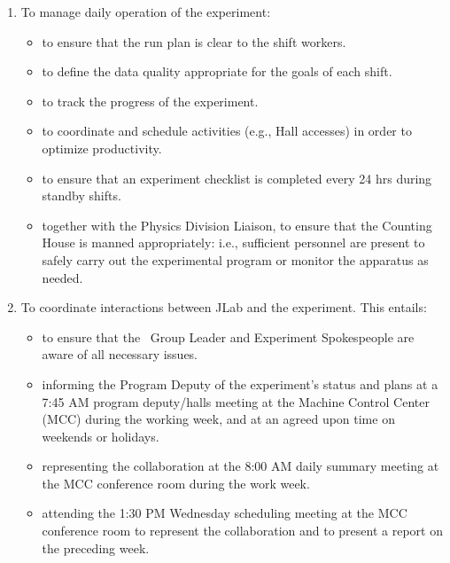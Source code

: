 \documentclass[11pt]{article}
\begin{document}
\begin{enumerate}[label=\Roman*.]
\item To manage daily operation of the experiment:

\begin{itemize}

\item to ensure that the run plan is clear to the shift workers.

\item to define the data quality appropriate for the goals of each shift.

\item to track the progress of the experiment.

\item to coordinate and schedule activities (e.g.,
Hall accesses) in order to optimize productivity.

\item to ensure that an experiment checklist is completed every 24 hrs during 
standby shifts.

\item together with the Physics Division Liaison, 
to ensure that the Counting House is manned appropriately: i.e.,
sufficient personnel are present to safely carry out the experimental 
program or monitor the apparatus as needed.

\end{itemize}



\item To coordinate interactions between JLab and the experiment. This
 entails:

\begin{itemize}

\item to ensure that the \HALL\ Group Leader and Experiment
Spokespeople are  aware of all necessary issues.

\item informing the Program Deputy of the experiment's status and plans at 
a 7:45 AM program deputy/halls meeting at the Machine Control Center (MCC) during the working week, and at an agreed
upon time on weekends or holidays.

\item representing the collaboration at the 8:00 AM daily summary meeting at the MCC conference 
room during the work week. 

\item attending the 1:30 PM Wednesday scheduling meeting at the MCC conference 
room to represent the collaboration and to present a report on the
preceding week.


\end{itemize}
\end{enumerate}
\end{document}
